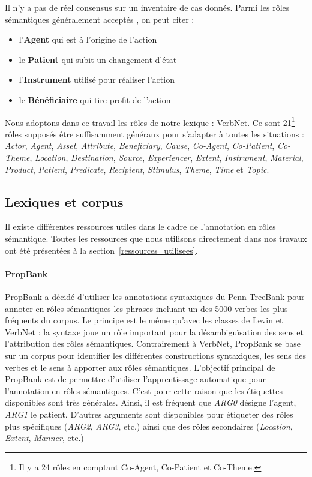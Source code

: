 Il n'y a pas de réel consensus sur un inventaire de cas donnés. Parmi les rôles
sémantiques généralement acceptés \citep[p.~4]{palmer2010semantic}, on peut
citer :

\begin{itemize}
    \item l'\textbf{Agent} qui est à l'origine de l'action
    \item le \textbf{Patient} qui subit un changement d'état
    \item l'\textbf{Instrument} utilisé pour réaliser l'action
    \item le \textbf{Bénéficiaire} qui tire profit de l'action
\end{itemize}

Nous adoptons dans ce travail les rôles de notre lexique : VerbNet. Ce sont
21\footnote{Il y a 24 rôles en comptant Co-Agent, Co-Patient et Co-Theme.}
rôles supposés être suffisamment généraux pour s'adapter à toutes les
situations : \emph{Actor}, \emph{Agent}, \emph{Asset}, \emph{Attribute},
\emph{Beneficiary}, \emph{Cause}, \emph{Co-Agent}, \emph{Co-Patient},
\emph{Co-Theme}, \emph{Location}, \emph{Destination}, \emph{Source},
\emph{Experiencer}, \emph{Extent}, \emph{Instrument}, \emph{Material},
\emph{Product}, \emph{Patient}, \emph{Predicate}, \emph{Recipient},
\emph{Stimulus}, \emph{Theme}, \emph{Time} et \emph{Topic}.

\subsection{Lexiques et corpus}
\label{ressources_non_utilisees}

Il existe différentes ressources utiles dans le cadre de l'annotation en rôles
sémantique. Toutes les ressources que nous utilisons directement dans nos
travaux ont été présentées à la section~\ref{ressources_utilisees}.

\paragraph{PropBank}

PropBank \citep{palmer2005proposition} a décidé d'utiliser les annotations
syntaxiques du Penn TreeBank \citep{marcus1993building} pour annoter en rôles
sémantiques les phrases incluant un des 5000 verbes les plus fréquents du
corpus. Le principe est le même qu'avec les classes de Levin et VerbNet : la
syntaxe joue un rôle important pour la désambiguïsation des sens et
l'attribution des rôles sémantiques. Contrairement à VerbNet, PropBank se base
sur un corpus pour identifier les différentes constructions syntaxiques, les
sens des verbes et le sens à apporter aux rôles sémantiques. L'objectif
principal de PropBank est de permettre d'utiliser l'apprentissage automatique
pour l'annotation en rôles sémantiques. C'est pour cette raison que les
étiquettes disponibles sont très générales. Ainsi, il est fréquent que
\textit{ARG0} désigne l'agent, \textit{ARG1} le patient. D'autres arguments
sont disponibles pour étiqueter des rôles plus spécifiques (\textit{ARG2},
\textit{ARG3}, etc.) ainsi que des rôles secondaires (\textit{Location},
\textit{Extent}, \textit{Manner}, etc.)

